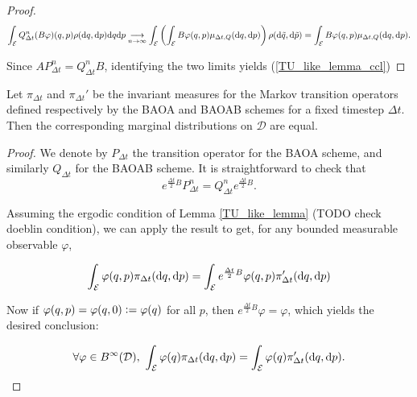 \begin{lemma}
\begin{proof}
        $$ \int_{\mathcal E} Q_{\Delta t}^n (B\varphi)(q,p) \rho(\text d q,\text d p) \text d q \text d p \underset{n\to\infty}{\longrightarrow}\int_{\mathcal E} \left (\int_{\mathcal E}B\varphi(q,p)\mu_{\Delta t,Q}(\text d q,\text d p)\right)\rho(\text d \tilde q,\text d \tilde p)=\int_{\mathcal E}B\varphi(q,p)\mu_{\Delta t,Q}(\text d q,\text d p).$$

        Since $AP_{\Delta t}^n=Q_{\Delta t}^n B$, identifying the two limits yields (\ref{TU_like_lemma_ccl})
    \end{proof}
\end{lemma}

\begin{corollary}
Let $ \pi_{\Delta t}$ and $\pi_{\Delta t}'$ be the invariant measures for the Markov transition operators defined respectively by the BAOA and BAOAB schemes for a fixed timestep $\Delta t$. Then the corresponding marginal distributions on $\mathcal D$ are equal.

\begin{proof}
    We denote by $P_{\Delta t}$ the transition operator for the BAOA scheme, and similarly $Q_{\Delta t}$ for the BAOAB scheme. It is straightforward to check that 
    $$ e^{\frac{\Delta t}2 B}P_{\Delta t}^n=Q_{\Delta t}^n e^{\frac{\Delta t}2 B}.$$

    Assuming the ergodic condition of Lemma \ref{TU_like_lemma} (TODO check doeblin condition), we can apply the result to get, for any bounded measurable observable $\varphi$,

    $$ \int_{\mathcal E} \varphi(q,p)\pi_{\Delta t}(\text d q,\text d p)=\int_{\mathcal E} e^{\frac{\Delta t}2 B}\varphi(q,p)\pi'_{\Delta t}(\text d q,\text d p)$$

    Now if $\varphi (q,p)= \varphi (q,0) \mathrel{\mathop:}= \varphi(q)$ for all $p$, then $e^{\frac{\Delta t}2 B}\varphi=\varphi$, which yields the desired conclusion:

    $$\forall \varphi \in B^\infty(\mathcal D),\ \int_{\mathcal E} \varphi(q)\pi_{\Delta t}(\text d q,\text d p)=\int_{\mathcal E}\varphi(q)\pi'_{\Delta t}(\text d q,\text d p).$$
\end{proof}

\end{corollary}

